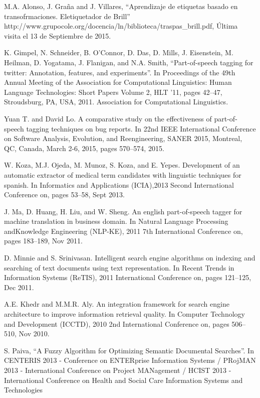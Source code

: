 \documentclass[runningheads,a4paper]{llncs}
\theoremstyle{break}
\begin{document}
\begin{thebibliography}{5}
M.A. Alonso, J. Graña and J. Villares, ``Aprendizaje de etiquetas basado en transofrmaciones. Eletiquetador de Brill'' http://www.grupocole.org/docencia/ln/biblioteca/traspas\_brill.pdf, Última visita el 13 de Septiembre de 2015.

K. Gimpel, N. Schneider, B. O’Connor, D. Das, D. Mills, J. Eisenstein, M. Heilman, D. Yogatama, J. Flanigan, and N.A. Smith, ``Part-of-speech tagging for twitter: Annotation, features, and experiments''. In Proceedings of the 49th Annual Meeting of the Association for Computational Linguistics: Human Language Technologies: Short Papers Volume 2, HLT ’11, pages 42–47, Stroudsburg, PA, USA, 2011. Association for Computational Linguistics.

Yuan T. and David Lo. A comparative study on the effectiveness of part-of-speech tagging techniques on bug reports. In 22nd IEEE International Conference on Software Analysis, Evolution, and Reengineering, SANER 2015, Montreal, QC, Canada, March 2-6, 2015, pages 570–574, 2015.

W. Koza, M.J. Ojeda, M. Munoz, S. Koza, and E. Yepes. Development of an automatic extractor of medical term candidates with linguistic techniques for spanish. In Informatics and Applications (ICIA),2013 Second International Conference on, pages 53–58, Sept 2013.

J. Ma, D. Huang, H. Liu, and W. Sheng. An english part-of-speech tagger for machine translation in business domain. In Natural Language Processing andKnowledge Engineering (NLP-KE), 2011 7th International Conference on, pages 183–189, Nov 2011.

D. Minnie and S. Srinivasan. Intelligent search engine algorithms on indexing and searching of text documents using text representation. In Recent Trends in Information Systems (ReTIS), 2011 International Conference on, pages 121–125, Dec 2011.

A.E. Khedr and M.M.R. Aly. An integration framework for search engine architecture to improve information retrieval quality. In Computer Technology and Development (ICCTD), 2010 2nd International Conference on, pages 506–510, Nov 2010.

S. Paiva, ``A Fuzzy Algorithm for Optimizing Semantic Documental Searches''. In CENTERIS 2013 - Conference on ENTERprise Information Systems / PRojMAN 2013 - International Conference on Project MANagement / HCIST 2013 - International Conference on Health and Social Care Information Systems and Technologies



\end{thebibliography}
\end{document}
